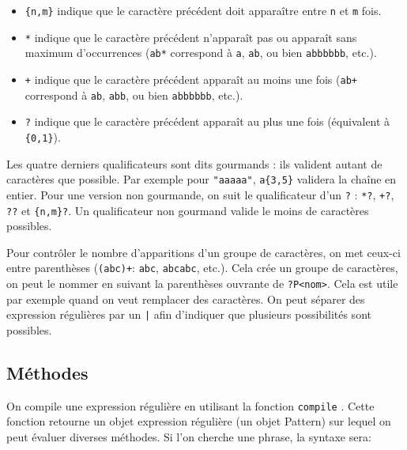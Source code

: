 \documentclass[a4paper, 10pt]{article}
\begin{document}
\begin{description}
\begin{itemize}
		      \item \og\texttt{\{n,m\}}\fg{} indique que le caractère précédent doit apparaître entre \texttt{n} et \texttt{m} fois.
		      \item \og\texttt{*}\fg{} indique que le caractère précédent n'apparaît pas ou apparaît sans maximum d'occurrences (\texttt{ab*} correspond à \texttt{a}, \texttt{ab}, ou bien \texttt{abbbbbb}, etc.).
		      \item \og\texttt{+}\fg{} indique que le caractère précédent apparaît au moins une fois (\texttt{ab+} correspond à \texttt{ab}, \texttt{abb}, ou bien \texttt{abbbbbb}, etc.).
		      \item \og\texttt{?}\fg{} indique que le caractère précédent apparaît au plus une fois (équivalent à \texttt{\{0,1\}}).
	      \end{itemize}
\end{description}

Les quatre derniers qualificateurs sont dits gourmands : ils valident autant de caractères que possible. Par exemple pour \texttt{"aaaaa"}, \texttt{a\{3,5\}} validera la chaîne en entier. Pour une version non gourmande, on suit le qualificateur d'un \texttt{?} : \texttt{*?}, \texttt{+?}, \texttt{??} et \texttt{\{n,m\}?}. Un qualificateur non gourmand valide le moins de caractères possibles.\bigskip

Pour contrôler le nombre d'apparitions d'un groupe de caractères, on met ceux-ci entre parenthèses (\texttt{(abc)+}: \texttt{abc}, \texttt{abcabc}, etc.). Cela crée un groupe de caractères, on peut le nommer en suivant la parenthèses ouvrante de \texttt{?P<nom>}. Cela est utile par exemple quand on veut remplacer des caractères. On peut séparer des expression régulières par un \texttt{|} afin d'indiquer que plusieurs possibilités sont possibles.\bigskip

\subsection{Méthodes}
On compile une expression régulière en utilisant la fonction \texttt{compile} . Cette fonction retourne un objet expression régulière (un objet Pattern) sur lequel on peut évaluer diverses méthodes. Si l'on cherche une phrase, la syntaxe sera:
\end{document}
